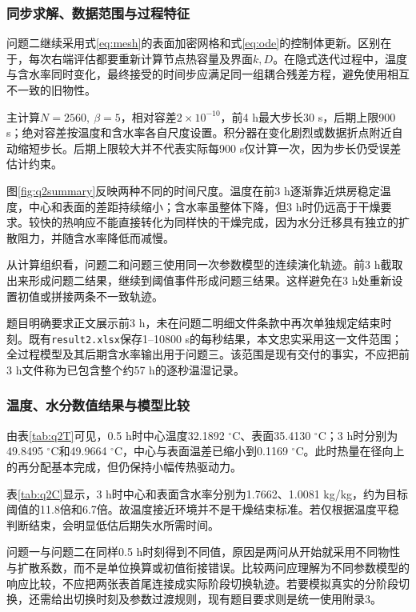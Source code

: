 \nextpage
\subsubsection{同步求解、数据范围与过程特征}
问题二继续采用式\eqref{eq:mesh}的表面加密网格和式\eqref{eq:ode}的控制体更新。区别在于，每次右端评估都要重新计算节点热容量及界面$k,D$。在隐式迭代过程中，温度与含水率同时变化，最终接受的时间步应满足同一组耦合残差方程，避免使用相互不一致的旧物性。

主计算$N=2560,\ \beta=5$，相对容差$2\times10^{-10}$，前4 h最大步长30 s，后期上限900 s；绝对容差按温度和含水率各自尺度设置。积分器在变化剧烈或数据折点附近自动缩短步长。后期上限较大并不代表实际每900 s仅计算一次，因为步长仍受误差估计约束。


图\ref{fig:q2summary}反映两种不同的时间尺度。温度在前3 h逐渐靠近烘房稳定温度，中心和表面的差距持续缩小；含水率虽整体下降，但3 h时仍远高于干燥要求。较快的热响应不能直接转化为同样快的干燥完成，因为水分迁移具有独立的扩散阻力，并随含水率降低而减慢。

从计算组织看，问题二和问题三使用同一次参数模型的连续演化轨迹。前3 h截取出来形成问题二结果，继续到阈值事件形成问题三结果。这样避免在3 h处重新设置初值或拼接两条不一致轨迹。

题目明确要求正文展示前3 h，未在问题二明细文件条款中再次单独规定结束时刻。既有\texttt{result2.xlsx}保存1--10800 s的每秒结果，本文忠实采用这一文件范围；全过程模型及其后期含水率输出用于问题三。该范围是现有交付的事实，不应把前3 h文件称为已包含整个约57 h的逐秒温湿记录。

\nextpage
\subsubsection{温度、水分数值结果与模型比较}



由表\ref{tab:q2T}可见，0.5 h时中心温度32.1892 $^\circ$C、表面35.4130 $^\circ$C；3 h时分别为49.8495 $^\circ$C和49.9664 $^\circ$C，中心与表面温差已缩小到0.1169 $^\circ$C。此时热量在径向上的再分配基本完成，但仍保持小幅传热驱动力。

表\ref{tab:q2C}显示，3 h时中心和表面含水率分别为1.7662、1.0081 kg/kg，约为目标阈值的11.8倍和6.7倍。故温度接近环境并不是干燥结束标准。若仅根据温度平稳判断结束，会明显低估后期失水所需时间。

问题一与问题二在同样0.5 h时刻得到不同值，原因是两问从开始就采用不同物性与扩散系数，而不是单位换算或初值衔接错误。比较两问应理解为不同参数模型的响应比较，不应把两张表首尾连接成实际阶段切换轨迹。若要模拟真实的分阶段切换，还需给出切换时刻及参数过渡规则，现有题目要求则是统一使用附录3。
